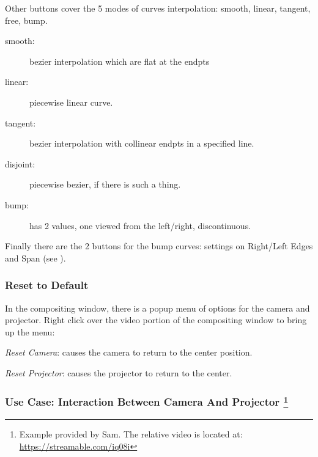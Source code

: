Other buttons cover the 5 modes of curves interpolation: smooth, linear, tangent, free, bump.

\begin{description}
	\item[smooth:] bezier interpolation which are flat at the endpts
	\item[linear:] piecewise linear curve.
	\item[tangent:] bezier interpolation with collinear endpts in a specified line.
	\item[disjoint:] piecewise bezier, if there is such a thing.
	\item[bump:] has 2 values, one viewed from the left/right, discontinuous.
\end{description}

Finally there are the 2 buttons for the bump curves: settings on Right/Left Edges and Span (see ).

\subsubsection*{Reset to Default}%
\label{ssub:reset_default}

In the compositing window, there is a popup menu of options for the camera and projector. Right click over the video portion of the compositing window to bring up the menu:

\textit{Reset Camera}: causes the camera to return to the center position.
    	
\textit{Reset Projector}: causes the projector to return to the center.

\subsubsection*{Use Case: Interaction Between Camera And Projector \protect\footnote{Example provided by Sam. The relative video is located at: \url{https://streamable.com/iq08i}}}%
\label{ssub:use_case_interaction_camera_projector}

